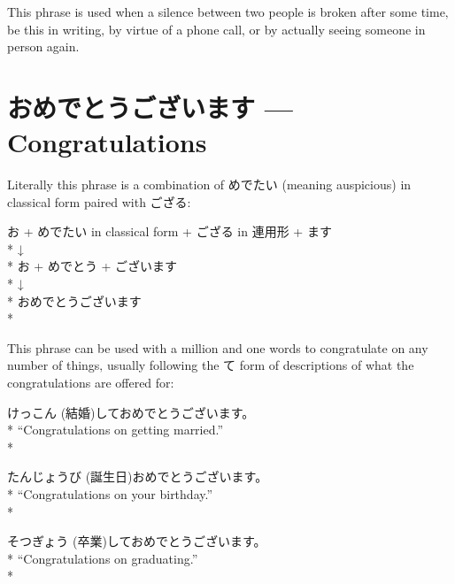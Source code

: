 \documentclass[11pt, b5paper, twoside, openright, onecolumn]{book}
\makeatletter
\newcommand*{\rubystack}[2]{{\relscale{0.5}%
  \begin{tabular}[b]{@{}c@{}}%
    {#1}\\%
   {\textscale{2}{#2}}%
  \end{tabular}}%
}
\DeclareRobustCommand*{\ruby}[2]{%
  \mbox{%
    \setlength{\parskip}{0ex}%
    \BeginAccSupp{method=pdfstringdef,ActualText={#1}}%
      \rubystack{\phantom{#2}}{#1}%
      \llap{%
        \rubystack{#2}{\phantom{#1}}%
      }%
    \EndAccSupp{}%
  }%
}
\renewcommand*{\ruby}[2]{#2 (#1)}%
\newenvironment{exampleblock}{
\setlength{\parindent}{0.6in}
\begin{minipage}[t]{\dimexpr\textwidth-\parindent}}
{\end{minipage}}
\makeatother
\begin{document}
This phrase is used when a silence between two people is broken after some time‚ be this in writing‚ by virtue of a phone call‚ or by actually seeing someone in person again.

\section*{おめでとうございます — Congratulations}

Literally this phrase is a combination of めでたい (meaning auspicious) in classical form paired with ござる:

\vspace{0.4cm}
\begin{exampleblock}
お + めでたい in classical form + ござる in 連用形 + ます \\* 
↓ \\* 
お + めでとう + ございます \\* 
↓ \\* 
おめでとうございます \\* 
\end{exampleblock}
\vspace{0.2cm}

This phrase can be used with a million and one words to congratulate on any number of things‚ usually following the て form of descriptions of what the congratulations are offered for:

\vspace{0.4cm}
\begin{exampleblock}
\ruby{結婚}{けっこん}しておめでとうございます。 \\* 
“Congratulations on getting married.” \\* 
\end{exampleblock}
\vspace{0.2cm}

\begin{exampleblock}
\ruby{誕生日}{たんじょうび}おめでとうございます。 \\* 
“Congratulations on your birthday.” \\* 
\end{exampleblock}
\vspace{0.2cm}

\begin{exampleblock}
\ruby{卒業}{そつぎょう}しておめでとうございます。 \\* 
“Congratulations on graduating.” \\* 
\end{exampleblock}
\vspace{0.2cm}
\end{document}
